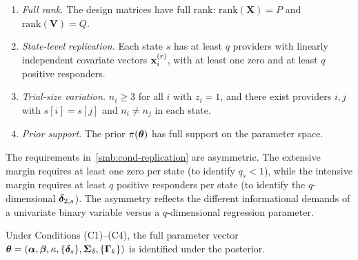 \begin{enumerate}[label=\textup{(C\arabic*)},nosep]
  \item \emph{Full rank.}
    The design matrices have full rank:
    $\mathrm{rank}(\mathbf{X}) = P$ and $\mathrm{rank}(\mathbf{V}) = Q$.
    \label{smb:cond-rank}

  \item \emph{State-level replication.}
    Each state $s$ has at least $q$ providers with linearly independent
    covariate vectors $\mathbf{x}_i^{(r)}$, with at least one zero and at least
    $q$ positive responders.
    \label{smb:cond-replication}

  \item \emph{Trial-size variation.}
    $n_i \ge 3$ for all $i$ with $z_i = 1$, and there exist providers
    $i, j$ with $s[i] = s[j]$ and $n_i \ne n_j$ in each state.
    \label{smb:cond-trial}

  \item \emph{Prior support.}
    The prior $\pi(\boldsymbol{\theta})$ has full support on the parameter space.
    \label{smb:cond-prior}
\end{enumerate}

\begin{remark}[Asymmetry in C2]\label{smb:rem-c2-asymmetry}
  The requirements in~\ref{smb:cond-replication} are asymmetric.
  The extensive margin requires at least one zero per state (to identify
  $q_s < 1$), while the intensive margin requires at least $q$ positive
  responders per state (to identify the $q$-dimensional
  $\boldsymbol{\delta}_{2,s}$). The asymmetry reflects the different informational
  demands of a univariate binary variable versus a $q$-dimensional
  regression parameter.
\end{remark}


\begin{theorem}
\label{smb:thm-identification}
  Under Conditions\/ \textup{(C1)--(C4)}, the full parameter vector
  $\boldsymbol{\theta} = (\boldsymbol{\alpha}, \boldsymbol{\beta}, \kappa, \{\boldsymbol{\delta}_s\}, \boldsymbol{\Sigma}_\delta,
  \{\boldsymbol{\Gamma}_k\})$ is identified under the posterior.
\end{theorem}

